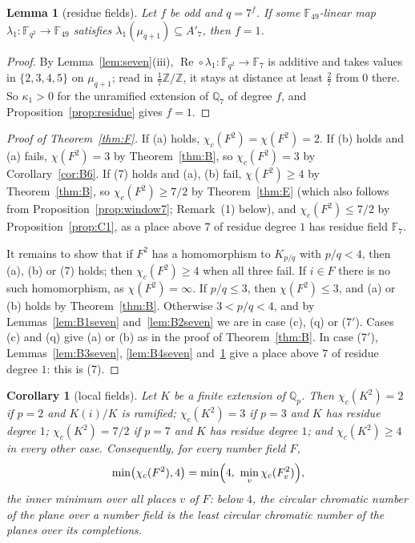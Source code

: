 \documentclass[11pt,a4paper]{amsart}
\newtheorem{lemma}{Lemma}
\newtheorem{corollary}{Corollary}
\theoremstyle{remark}
\newcommand{\Q}{\mathbb{Q}}
\newcommand{\Z}{\mathbb{Z}}
\newcommand{\F}{\mathbb{F}}
\begin{document}
\begin{lemma}[residue fields]\label{lem:B5seven}
Let $f$ be odd and $q=7^f$. If some $\F_{49}$-linear map $\lambda_1:\F_{q^2}\to\F_{49}$ satisfies
$\lambda_1(\mu_{q+1})\subseteq A'_7$, then $f=1$.
\end{lemma}

\begin{proof}
By Lemma~\ref{lem:seven}(iii), $\operatorname{Re}\circ\lambda_1:\F_{q^2}\to\F_7$ is additive and takes values in
$\{2,3,4,5\}$ on $\mu_{q+1}$; read in $\frac17\Z/\Z$, it stays at distance at least $\frac27$ from $0$ there. So
$\kappa_1>0$ for the unramified extension of $\Q_7$ of degree $f$, and Proposition~\ref{prop:residue} gives $f=1$.
\end{proof}

\begin{proof}[Proof of Theorem~\ref{thm:F}]
If (a) holds, $\chi_c(F^2)=\chi(F^2)=2$. If (b) holds and (a) fails, $\chi(F^2)=3$ by Theorem~\ref{thm:B}, so
$\chi_c(F^2)=3$ by Corollary~\ref{cor:B6}. If (7) holds and (a), (b) fail, $\chi(F^2)\ge4$ by Theorem~\ref{thm:B}, so
$\chi_c(F^2)\ge7/2$ by Theorem~\ref{thm:E} (which also follows from Proposition~\ref{prop:window7}; Remark~(1)
below), and $\chi_c(F^2)\le7/2$ by Proposition~\ref{prop:C1}, as a place above
$7$ of residue degree $1$ has residue field $\F_7$.

It remains to show that if $F^2$ has a homomorphism to $K_{p/q}$ with $p/q<4$, then (a), (b) or (7) holds; then
$\chi_c(F^2)\ge4$ when all three fail. If $i\in F$ there is no such homomorphism, as $\chi(F^2)=\infty$. If
$p/q\le3$, then $\chi(F^2)\le3$, and (a) or (b) holds by Theorem~\ref{thm:B}. Otherwise $3<p/q<4$, and by
Lemmas~\ref{lem:B1seven} and~\ref{lem:B2seven} we are in case (c), (q) or (7$'$). Cases (c) and (q) give (a) or (b)
as in the proof of Theorem~\ref{thm:B}. In case (7$'$), Lemmas~\ref{lem:B3seven}, \ref{lem:B4seven}
and~\ref{lem:B5seven} give a place above $7$ of residue degree $1$: this is (7).
\end{proof}

\begin{corollary}[local fields]\label{cor:localF}
Let $K$ be a finite extension of $\Q_p$. Then $\chi_c(K^2)=2$ if $p=2$ and $K(i)/K$ is ramified; $\chi_c(K^2)=3$ if
$p=3$ and $K$ has residue degree $1$; $\chi_c(K^2)=7/2$ if $p=7$ and $K$ has residue degree $1$; and
$\chi_c(K^2)\ge4$ in every other case. Consequently, for every number field $F$,
\[
\min\bigl(\chi_c(F^2),4\bigr)=\min\Bigl(4,\ \min_v\chi_c(F_v^2)\Bigr),
\]
the inner minimum over all places $v$ of $F$: below $4$, the circular chromatic number of the plane over a number
field is the least circular chromatic number of the planes over its completions.
\end{corollary}
\end{document}

